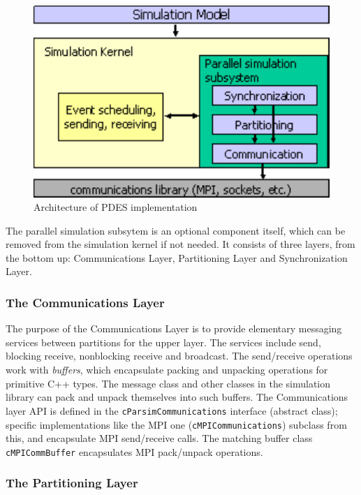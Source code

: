 \begin{figure}[htbp]
  \begin{center}
    \includegraphics{figures/parsim-arch}
    \caption{Architecture of {\opp} PDES implementation}
    \label{fig:parsim-arch}
  \end{center}
\end{figure}

The parallel simulation subsytem is an optional component
itself, which can be removed from the simulation kernel
if not needed. It consists of three layers, from the bottom up:
Communications Layer, Partitioning Layer and Synchronization Layer.

\subsubsection{The Communications Layer}

The purpose of the Communications Layer is to
provide elementary messaging services between partitions for the
upper layer. The services include send, blocking receive,
nonblocking receive and broadcast. The send/receive operations
work with \textit{buffers}, which encapsulate packing and unpacking
operations for primitive C++ types. The message class and
other classes in the simulation library can pack and unpack
themselves into such buffers. The Communications layer API
is defined in the \texttt{cParsimCommunications} interface
(abstract class); specific implementations like the MPI
one (\texttt{cMPICommunications}) subclass from this,
and encapsulate MPI send/receive calls. The matching buffer
class \texttt{cMPICommBuffer} encapsulates MPI pack/unpack
operations.

\subsubsection{The Partitioning Layer}

